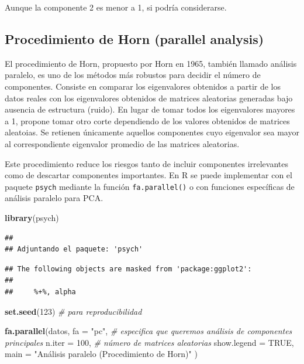 \documentclass[
]{book}
\newenvironment{Shaded}{\begin{snugshade}}{\end{snugshade}}
\newcommand{\AttributeTok}[1]{\textcolor[rgb]{0.13,0.29,0.53}{#1}}
\newcommand{\CommentTok}[1]{\textcolor[rgb]{0.56,0.35,0.01}{\textit{#1}}}
\newcommand{\ConstantTok}[1]{\textcolor[rgb]{0.56,0.35,0.01}{#1}}
\newcommand{\DecValTok}[1]{\textcolor[rgb]{0.00,0.00,0.81}{#1}}
\newcommand{\FunctionTok}[1]{\textcolor[rgb]{0.13,0.29,0.53}{\textbf{#1}}}
\newcommand{\NormalTok}[1]{#1}
\newcommand{\StringTok}[1]{\textcolor[rgb]{0.31,0.60,0.02}{#1}}
\begin{document}
Aunque la componente 2 es menor a 1, si podría considerarse.

\subsection{Procedimiento de Horn (parallel analysis)}\label{procedimiento-de-horn-parallel-analysis}

El procedimiento de Horn, propuesto por Horn en 1965, también llamado análisis paralelo, es uno de los métodos más robustos para decidir el número de componentes.
Consiste en comparar los eigenvalores obtenidos a partir de los datos reales con los eigenvalores obtenidos de matrices aleatorias generadas bajo ausencia de estructura (ruido). En lugar de tomar todos los eigenvalores mayores a 1, propone tomar otro corte dependiendo de los valores obtenidos de matrices aleatoias.
Se retienen únicamente aquellos componentes cuyo eigenvalor sea mayor al correspondiente eigenvalor promedio de las matrices aleatorias.

Este procedimiento reduce los riesgos tanto de incluir componentes irrelevantes como de descartar componentes importantes. En R se puede implementar con el paquete \texttt{psych} mediante la función \texttt{fa.parallel()} o con funciones específicas de análisis paralelo para PCA.

\begin{Shaded}
\begin{Highlighting}[]
\FunctionTok{library}\NormalTok{(psych)}
\end{Highlighting}
\end{Shaded}

\begin{verbatim}
## 
## Adjuntando el paquete: 'psych'
\end{verbatim}

\begin{verbatim}
## The following objects are masked from 'package:ggplot2':
## 
##     %+%, alpha
\end{verbatim}

\begin{Shaded}
\begin{Highlighting}[]
\FunctionTok{set.seed}\NormalTok{(}\DecValTok{123}\NormalTok{) }\CommentTok{\# para reproducibilidad}

\FunctionTok{fa.parallel}\NormalTok{(datos, }
            \AttributeTok{fa =} \StringTok{"pc"}\NormalTok{, }\CommentTok{\# especifica que queremos análisis de componentes principales}
            \AttributeTok{n.iter =} \DecValTok{100}\NormalTok{, }\CommentTok{\# número de matrices aleatorias}
            \AttributeTok{show.legend =} \ConstantTok{TRUE}\NormalTok{,}
            \AttributeTok{main =} \StringTok{"Análisis paralelo (Procedimiento de Horn)"}
\NormalTok{            )}
\end{Highlighting}
\end{Shaded}
\end{document}
